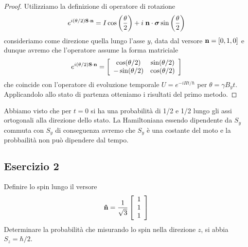 \begin{proof}
\newline
Utilizziamo la definizione di operatore di rotazione 
\begin{equation*}
	e^{i(\theta/2)\bold{S} \cdot \bold{n}} = I \cos \left (\frac{\theta}{2} \right ) + i \;\bold{n} \cdot \boldsymbol{\sigma} \sin \left (\frac{\theta}{2} \right)
\end{equation*}
consideriamo come direzione quella lungo l'asse $y$, data dal versore $\bold{n} = [0,1,0]$
e dunque avremo che l'operatore assume la forma matriciale
\begin{equation*}
	e^{i(\theta/2)\bold{S} \cdot \bold{n}} = \left [\begin{array}{cc}
		\cos(\theta/2) & \sin(\theta/2) \\
		- \sin(\theta/2) & \cos(\theta/2)
	\end{array} \right ]
\end{equation*}
che coincide con l'operatore di evoluzione temporale $U = e^{-iHt/\hbar}$ per $\theta = \gamma B_y t$. Applicandolo allo stato di partenza otteniamo i risultati del primo metodo.

\end{proof}
\newpage 

Abbiamo visto che per $t = 0$ si ha una probabilit\`a di 1/2 e 1/2 lungo gli assi ortogonali alla direzione dello stato.  La Hamiltoniana essendo dipendente da $S_y$ commuta con $S_y$ di conseguenza avremo che $S_y$ \`e una costante del moto e la probbailit\`a non pu\`o dipendere dal tempo.

\subsection{Esercizio 2}

Definire lo spin lungo il versore 
\begin{equation*}
	\bold{\hat{n}} = \frac{1}{\sqrt{3}} \left [ \begin{array}{c}
		1 \\ 1 \\ 1
	\end{array}\right ]
\end{equation*}
Determinare la probabilit\`a che misurando lo spin nella direzione $z$, si abbia $S_z = \hbar /2 $. 

